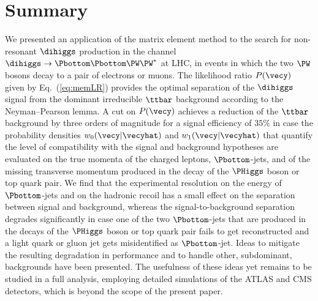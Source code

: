 \section{Summary}
\label{sec:summary}

We presented an application of the matrix element method 
to the search for non-resonant $\dihiggs$ production in the channel $\dihiggs \to \Pbottom\Pbottom\PW\PW^{*}$ at LHC,
in events in which the two $\PW$ bosons decay to a pair of electrons or muons.
The likelihood ratio $P(\vecy)$ given by Eq.~(\ref{eq:memLR}) provides the optimal separation of the $\dihiggs$ signal from the dominant irreducible $\ttbar$ background
according to the Neyman–Pearson lemma.
A cut on $P(\vecy)$ achieves a reduction of the $\ttbar$ background by three orders of magnitude for a signal efficiency of $35\%$
in case the probability densities $w_{0}(\vecy|\vecyhat)$ and $w_{1}(\vecy|\vecyhat)$ that quantify the level of compatibility with the signal and background hypotheses
are evaluated on the true momenta of the charged leptons, $\Pbottom$-jets, and of the missing transverse momentum produced in the decay of the $\PHiggs$ boson or top quark pair.
We find that the experimental resolution on the energy of $\Pbottom$-jets and on the hadronic recoil has a small effect on the separation between signal and background,
whereas the signal-to-background separation degrades significantly in case one of the two $\Pbottom$-jets that are produced in the decays of the $\PHiggs$ boson or top quark pair
fails to get reconstructed and a light quark or gluon jet gets misidentified as $\Pbottom$-jet.
Ideas to mitigate the resulting degradation in performance and to handle other, subdominant, backgrounds have been presented.
The usefulness of these ideas yet remains to be studied in a full analysis, employing detailed simulations of the ATLAS and CMS detectors, which is beyond the scope of the present paper.
